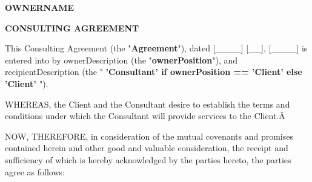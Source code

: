 \documentclass[12pt]{article}
\newcommand{\VAR}[1]{{\color{blue}#1}}
\begin{document}
\begin{center}
{\scshape\Large \par}
\vspace{1.5cm}
{\huge\bfseries \uppercase{\VAR{ownerName}} \par}
\vspace{1cm}
{\huge\bfseries CONSULTING AGREEMENT \par}
\vspace{1cm}
\end{center}

This Consulting Agreement (the "{\bf Agreement}"), dated [\_\_\_\_] [\_\_], [\_\_\_\_] is entered into by \VAR{ownerDescription} (the "{\bf \VAR{ownerPosition}}"), and \VAR{recipientDescription} (the "{\bf
    \VAR{ 'Consultant' if ownerPosition == 'Client' else 'Client' }
}").

WHEREAS, the Client and the Consultant desire to establish the terms and conditions under which the Consultant will provide services to the Client.Â 

NOW, THEREFORE, in consideration of the mutual covenants and promises contained herein and other good and valuable consideration, the receipt and sufficiency of which is hereby acknowledged by the parties hereto, the parties agree as follows:
\end{document}
